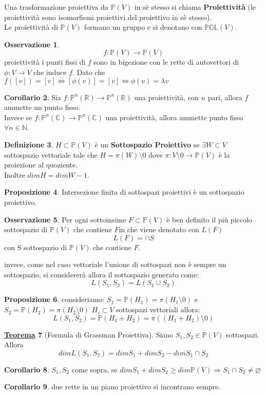 \documentclass[a4paper,twoside]{article}
\newcommand{\N}{\mathbb{N}}
\newcommand{\C}{\mathbb{C}}
\newcommand{\R}{\mathbb{R}}
\newcommand{\Pro}{\mathbb{P}}
\theoremstyle{definition}
\newtheorem{theorem}{\color{Red}\underline{\textrm Teorema}}
\newtheorem{cor}[theorem]{Corollario}
\newtheorem{definizione}[theorem]{Definizione}
\newtheorem{oss}[theorem]{Osservazione}
\newtheorem{prop}[theorem]{Proposizione}
\numberwithin{theorem}{section}
\begin{document}
Una trasformazione proiettiva da $\Pro(V)$ in sè stesso si chiama \textbf{Proiettività} (le proiettività sono isomorfismi proiettivi del proiettivo in sè stesso).\\
Le proiettività di $\Pro(V)$ formano un gruppo e si denotano con $\mathbb{PGL}(V)$.\\
\begin{oss}
    $$f:\Pro(V)\to\Pro(V)$$ proiettività i punti fissi di $f$ sono in bigezione con le rette di autovettori di $\phi:V\to V$ che induce $f$. Dato che $f([v])=[v]\Leftrightarrow [\phi(v)]=[v]\Leftrightarrow \phi(v)=\lambda v$ 
\end{oss}
\begin{cor}
Sia $f:\Pro^n(\R)\to\Pro^n(\R)$ una proiettività, con $n$ pari, allora $f$ ammette un punto fisso. \\
Invece se $f:\Pro^n(\C)\to\Pro^n(\C)$ una proiettività, allora ammette punto fisso $\forall n\in\N$.
\end{cor}
\begin{definizione}
$H\subset\Pro(V)$ è un \textbf{Sottospazio Proiettivo} se $\exists W\subset V$ sottospazio vettoriale tale che $H=\pi(W)\setminus{0}$ dove $\pi:V\setminus{0}\to\Pro(V)$ è la proiezione al quoziente.\\
Inoltre $dim H=dim W-1$.
\end{definizione}
\begin{prop}
Intersezione finita di sottospazi proiettivi è un sottospazio proiettivo.
\end{prop}
\begin{oss}
    Per ogni sottoinsime $F\subset\Pro(V)$ è ben definito il più piccolo sottospazio di $\Pro(V)$ che contiene $F$m che viene denotato con $L(F)$
$$L(F)=\cap S$$
con S sottospazio di $\Pro(V)$ che contiene $F$.
\end{oss}

invece, come nel caso vettoriale l'unione di sottospazi non è sempre un sottospazio, si considererà allora il sottospazio generato come:
$$L(S_1,S_2)=L(S_1\cup S_2)$$
\begin{prop}
    consideriamo:
    $S_1=\Pro(H_1)=\pi(H_1\setminus{0})$ e $S_2=\Pro(H_2)=\pi(H_2\setminus{0})$ 
    $H_i\subset V$ sottospazi vettoriali allora: $$L(S_1,S_2)=\Pro(H_1+H_2)=\pi((H_1+H_2)\setminus{0})$$

\end{prop}
\begin{theorem}[Formula di Grassman Proiettiva]
Siano $S_1,S_2\in\Pro(V)$ sottospazi. Allora
$$dimL(S_1,S_2)=dimS_1+dimS_2-dimS_1\cap S_2$$
\end{theorem}
\begin{cor}
    $S_1,S_2$ come sopra, se $dimS_1+dimS_2\geq dim\Pro(V)\Rightarrow S_1\cap S_2 \neq \varnothing$
\end{cor}
\begin{cor}
    due rette in un piano proiettivo si incontrano sempre.
\end{cor}
\end{document}
